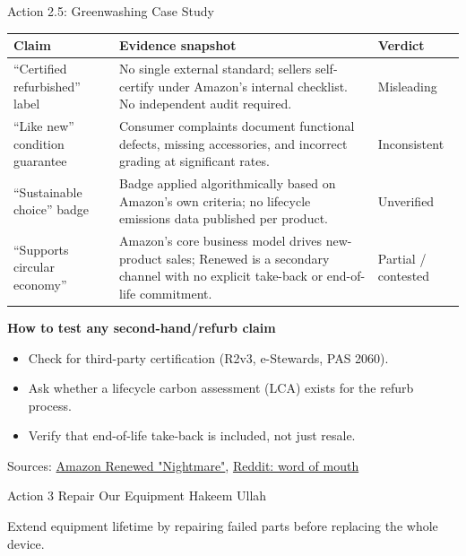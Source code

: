 \documentclass[aspectratio=169]{beamer}
\begin{document}
\begin{frame}{Action 2.5: Greenwashing Case Study}
\scriptsize
\begin{tabular}{p{2.5cm}p{5.6cm}p{2.2cm}}
\toprule
Claim & Evidence snapshot & Verdict \\
\midrule
``Certified refurbished'' label & No single external standard; sellers self-certify under Amazon's internal checklist. No independent audit required. & Misleading \\
``Like new'' condition guarantee & Consumer complaints document functional defects, missing accessories, and incorrect grading at significant rates. & Inconsistent \\
``Sustainable choice'' badge & Badge applied algorithmically based on Amazon's own criteria; no lifecycle emissions data published per product. & Unverified \\
``Supports circular economy'' & Amazon's core business model drives new-product sales; Renewed is a secondary channel with no explicit take-back or end-of-life commitment. & Partial / contested \\
\bottomrule
\end{tabular}

\vspace{0.15cm}
\textbf{How to test any second-hand/refurb claim}
\begin{itemize}
  \item Check for third-party certification (R2v3, e-Stewards, PAS 2060).
  \item Ask whether a lifecycle carbon assessment (LCA) exists for the refurb process.
  \item Verify that end-of-life take-back is included, not just resale.
\end{itemize}
\vspace{0.05cm}
\tiny Sources: \href{https://medium.com/@blakewhole/my-amazon-renewed-laptop-nightmare-as-told-through-the-works-of-vincent-van-gogh-a3d52ce31922}{Amazon Renewed "Nightmare"}, \href{https://www.reddit.com/r/amazonprime/comments/1qx8q6d/dont_order_refurbished_devices_from_amazon/}{Reddit: word of mouth}
\end{frame}


\renewcommand{\insertshortauthor}{Hakeem Ullah et al.}

\begin{frame}
\centering
\vfill
{Action 3}
\vskip 0.3cm
{Repair Our Equipment}
\vskip 0.2cm
{\small Hakeem Ullah}
\vskip 0.5cm
\begin{minipage}{0.8\textwidth}
  \centering\small
  Extend equipment lifetime by repairing failed parts before replacing the whole device.
\end{minipage}
\vfill
\end{frame}
\end{document}
